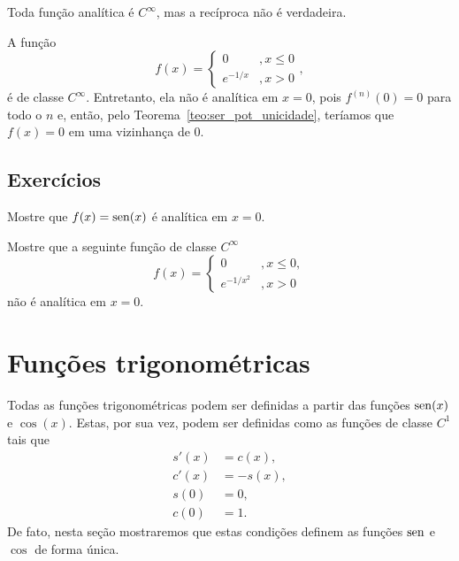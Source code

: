 \begin{obs}
  Toda função analítica é $C^\infty$, mas a recíproca não é verdadeira.
\end{obs}

\begin{ex}
  A função
  \begin{equation}
    f(x) = \left\{
      \begin{array}{ll}
        0 &, x\leq 0\\
        e^{-1/x} &, x>0
      \end{array}
\right.,
  \end{equation}
é de classe $C^\infty$. Entretanto, ela não é analítica em $x=0$, pois $f^{(n)}(0)=0$ para todo o $n$ e, então, pelo Teorema~\ref{teo:ser_pot_unicidade}, teríamos que $f(x)= 0$ em uma vizinhança de $0$.
\end{ex}

\subsection*{Exercícios}

\begin{exer}
  Mostre que $f(x)=\operatorname{sen}(x)$ é analítica em $x=0$.
\end{exer}

\begin{exer}
  Mostre que a seguinte função de classe $C^\infty$
  \begin{equation}
    f(x) = \left\{
      \begin{array}{ll}
        0 &,x\leq 0,\\
        e^{-1/x^2} &,x> 0
      \end{array}
\right.
  \end{equation}
não é analítica em $x=0$.
\end{exer}

\section{Funções trigonométricas}\label{cap_ssfuncoes_sec_fun_trigo}

Todas as funções trigonométricas podem ser definidas a partir das funções $\operatorname{sen}(x)$ e $\cos(x)$. Estas, por sua vez, podem ser definidas como as funções de classe $C^1$ tais que
\begin{align}
  s'(x) &= c(x),\label{eq:s_deriv}\\
  c'(x) &= -s(x),\label{eq:c_deriv}\\
  s(0) &= 0,\label{eq:s_0}\\
  c(0) &= 1.\label{eq:c_1}
\end{align}
De fato, nesta seção mostraremos que estas condições definem as funções $\operatorname{sen}$ e $\cos$ de forma única.


